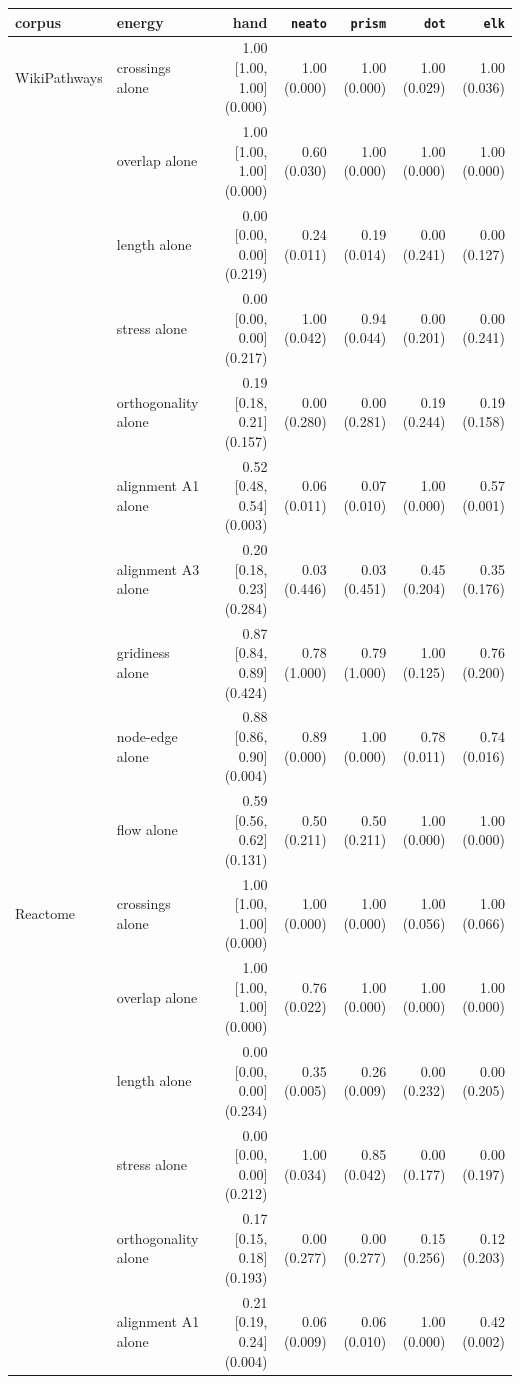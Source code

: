 \documentclass[11pt]{article}
\begin{document}
\begin{center}\scriptsize\setlength{\tabcolsep}{3.5pt}
\begin{tabular}{llrrrrr}
\toprule
corpus & energy & hand & \texttt{neato} & \texttt{prism} & \texttt{dot} & \texttt{elk} \\
\midrule
WikiPathways & crossings alone & 1.00 [1.00, 1.00] (0.000) & 1.00 (0.000) & 1.00 (0.000) & 1.00 (0.029) & 1.00 (0.036) \\
& overlap alone & 1.00 [1.00, 1.00] (0.000) & 0.60 (0.030) & 1.00 (0.000) & 1.00 (0.000) & 1.00 (0.000) \\
& length alone & 0.00 [0.00, 0.00] (0.219) & 0.24 (0.011) & 0.19 (0.014) & 0.00 (0.241) & 0.00 (0.127) \\
& stress alone & 0.00 [0.00, 0.00] (0.217) & 1.00 (0.042) & 0.94 (0.044) & 0.00 (0.201) & 0.00 (0.241) \\
& orthogonality alone & 0.19 [0.18, 0.21] (0.157) & 0.00 (0.280) & 0.00 (0.281) & 0.19 (0.244) & 0.19 (0.158) \\
& alignment A1 alone & 0.52 [0.48, 0.54] (0.003) & 0.06 (0.011) & 0.07 (0.010) & 1.00 (0.000) & 0.57 (0.001) \\
& alignment A3 alone & 0.20 [0.18, 0.23] (0.284) & 0.03 (0.446) & 0.03 (0.451) & 0.45 (0.204) & 0.35 (0.176) \\
& gridiness alone & 0.87 [0.84, 0.89] (0.424) & 0.78 (1.000) & 0.79 (1.000) & 1.00 (0.125) & 0.76 (0.200) \\
& node-edge alone & 0.88 [0.86, 0.90] (0.004) & 0.89 (0.000) & 1.00 (0.000) & 0.78 (0.011) & 0.74 (0.016) \\
& flow alone & 0.59 [0.56, 0.62] (0.131) & 0.50 (0.211) & 0.50 (0.211) & 1.00 (0.000) & 1.00 (0.000) \\
\midrule
Reactome & crossings alone & 1.00 [1.00, 1.00] (0.000) & 1.00 (0.000) & 1.00 (0.000) & 1.00 (0.056) & 1.00 (0.066) \\
& overlap alone & 1.00 [1.00, 1.00] (0.000) & 0.76 (0.022) & 1.00 (0.000) & 1.00 (0.000) & 1.00 (0.000) \\
& length alone & 0.00 [0.00, 0.00] (0.234) & 0.35 (0.005) & 0.26 (0.009) & 0.00 (0.232) & 0.00 (0.205) \\
& stress alone & 0.00 [0.00, 0.00] (0.212) & 1.00 (0.034) & 0.85 (0.042) & 0.00 (0.177) & 0.00 (0.197) \\
& orthogonality alone & 0.17 [0.15, 0.18] (0.193) & 0.00 (0.277) & 0.00 (0.277) & 0.15 (0.256) & 0.12 (0.203) \\
& alignment A1 alone & 0.21 [0.19, 0.24] (0.004) & 0.06 (0.009) & 0.06 (0.010) & 1.00 (0.000) & 0.42 (0.002) \\

\end{tabular}
\end{center}
\end{document}
